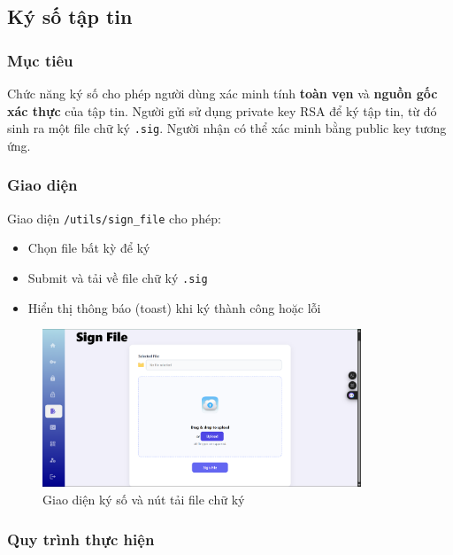 \newpage
\subsection{Ký số tập tin}

\subsubsection*{Mục tiêu}
Chức năng ký số cho phép người dùng xác minh tính \textbf{toàn vẹn} và \textbf{nguồn gốc xác thực} của tập tin. Người gửi sử dụng private key RSA để ký tập tin, từ đó sinh ra một file chữ ký \texttt{.sig}. Người nhận có thể xác minh bằng public key tương ứng.

\subsubsection*{Giao diện}
Giao diện \texttt{/utils/sign\_file} cho phép:
\begin{itemize}
    \item Chọn file bất kỳ để ký
    \item Submit và tải về file chữ ký \texttt{.sig}
    \item Hiển thị thông báo (toast) khi ký thành công hoặc lỗi
\end{itemize}

\begin{figure}[H]
    \centering
    \includegraphics[width=0.85\textwidth]{img/8_sign/8_sign_form.png}
    \caption{Giao diện ký số và nút tải file chữ ký}
\end{figure}

\subsubsection*{Quy trình thực hiện}

